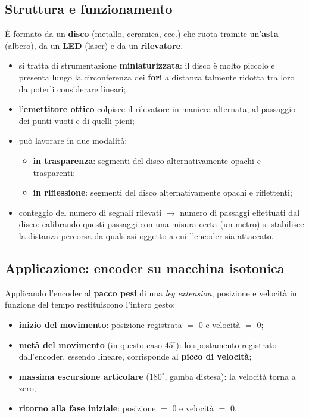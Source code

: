 \subsection{Struttura e funzionamento}

È formato da un \textbf{disco} (metallo, ceramica, ecc.) che ruota tramite un'\textbf{asta}
(albero), da un \textbf{LED} (laser) e da un \textbf{rilevatore}.

\begin{itemize}
  \item si tratta di strumentazione \textbf{miniaturizzata}: il disco è molto piccolo e presenta
    lungo la circonferenza dei \textbf{fori} a distanza talmente ridotta tra loro da poterli
    considerare lineari;
  \item l'\textbf{emettitore ottico} colpisce il rilevatore in maniera alternata, al passaggio
    dei punti vuoti e di quelli pieni;
  \item può lavorare in due modalità:
    \begin{itemize}
      \item \textbf{in trasparenza}: segmenti del disco alternativamente opachi e trasparenti;
      \item \textbf{in riflessione}: segmenti del disco alternativamente opachi e riflettenti;
    \end{itemize}
  \item conteggio del numero di segnali rilevati $\rightarrow$ numero di passaggi effettuati dal
    disco: calibrando questi passaggi con una misura certa (un metro) si stabilisce la distanza
    percorsa da qualsiasi oggetto a cui l'encoder sia attaccato.
\end{itemize}

\subsection{Applicazione: encoder su macchina isotonica}

Applicando l'encoder al \textbf{pacco pesi} di una \textit{leg extension}, posizione e velocità in
funzione del tempo restituiscono l'intero gesto:

\begin{itemize}
  \item \textbf{inizio del movimento}: posizione registrata $=$ 0 e velocità $=$ 0;
  \item \textbf{metà del movimento} (in questo caso $45^\circ$): lo spostamento registrato
    dall'encoder, essendo lineare, corrisponde al \textbf{picco di velocità};
  \item \textbf{massima escursione articolare} ($180^\circ$, gamba distesa): la velocità torna a
    zero;
  \item \textbf{ritorno alla fase iniziale}: posizione $=$ 0 e velocità $=$ 0.
\end{itemize}

